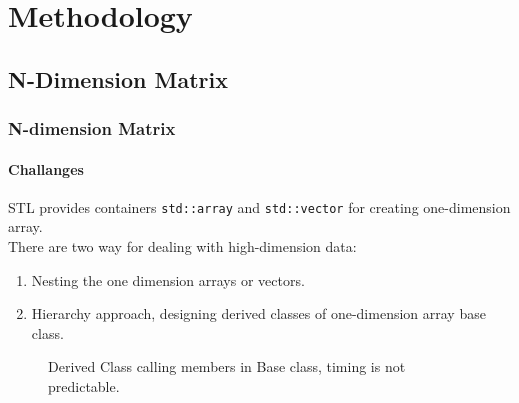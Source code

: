 \section{Methodology}

\subsection{N-Dimension Matrix}
\begin{frame}
  \frametitle{N-dimension Matrix}
  \framesubtitle{Challanges}
  STL provides containers \texttt{std::array} and \texttt{std::vector} for creating one-dimension array.
  \\
  There are two way for dealing with high-dimension data:
  \begin{enumerate}
    \item Nesting the one dimension arrays or vectors.
    \item Hierarchy approach, designing derived classes of one-dimension array base class.
  \end{enumerate}
  \begin{figure}[htbp]
    \centering
    \caption{Derived Class calling members in Base class, timing is not predictable.}
    \label{<label>}
  \end{figure}
\end{frame}


